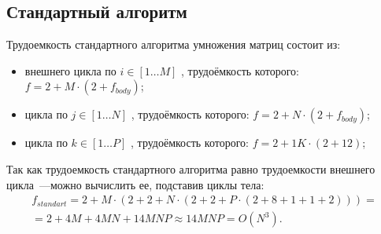 \subsection*{Стандартный алгоритм}
Трудоемкость стандартного алгоритма умножения матриц состоит из:
\begin{itemize}
	\item внешнего цикла по $i \in [1 \ldots M]$ , трудоёмкость которого: $f = 2 + M \cdot (2 + f_{body})$;
	\item цикла по $j \in [1 \ldots N]$ , трудоёмкость которого: $f = 2 + N \cdot (2 + f_{body})$;
	\item цикла по $k \in [1 \ldots P]$ , трудоёмкость которого: $f = 2 + 1K \cdot (2 + 12)$;
\end{itemize}
Так как трудоемкость стандартного алгоритма равно трудоемкости внешнего цикла~---можно вычислить ее, подставив циклы тела:
\begin{equation}
	\begin{gathered}
		f_{standart} = 2 + M \cdot (2 + 2 + N \cdot (2 + 2 + P \cdot (2 + 8 + 1 + 1 + 2))) = \\
		= 2 + 4M + 4MN + 14MNP \approx 14MNP = O(N^3).
	\end{gathered}
\end{equation}

